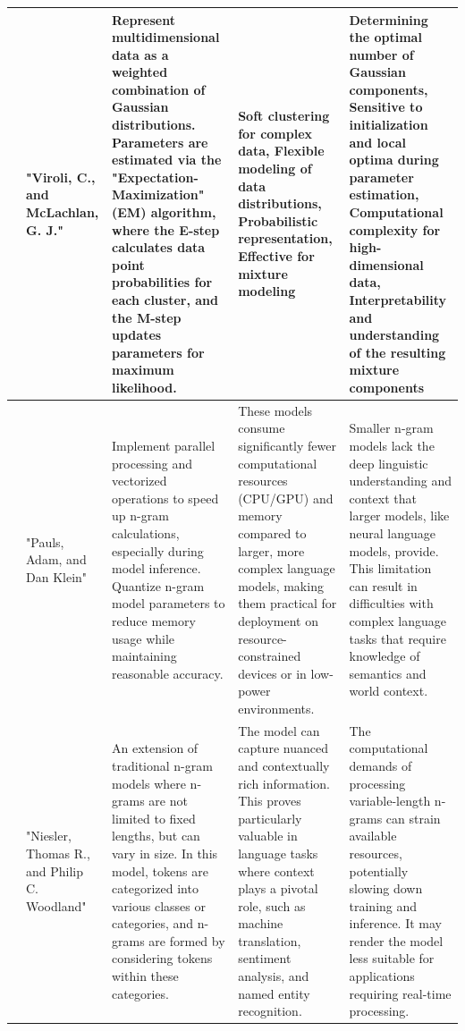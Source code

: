 \documentclass[conference]{IEEEtran}
\begin{document}
\begin{table}
\begin{center}
\begin{tabular}{ |p{1cm}|p{2cm}|p{4cm}|p{4cm}|p{4cm}| }
\hline
[9] &  "Viroli, C., and McLachlan, G. J." & Represent multidimensional data as a weighted combination of Gaussian distributions. Parameters are estimated via the "Expectation-Maximization" (EM) algorithm, where the E-step calculates data point probabilities for each cluster, and the M-step updates parameters for maximum likelihood. &  Soft clustering for complex data, Flexible modeling of data distributions, Probabilistic representation, Effective for mixture modeling &  Determining the optimal number of Gaussian components, Sensitive to initialization and local optima during parameter estimation, Computational complexity for high-dimensional data, Interpretability and understanding of the resulting mixture components \\
\hline
[10] &  "Pauls, Adam, and Dan Klein" &  Implement parallel processing and vectorized operations to speed up n-gram calculations, especially during model inference. Quantize n-gram model parameters to reduce memory usage while maintaining reasonable accuracy. &  These models consume significantly fewer computational resources (CPU/GPU) and memory compared to larger, more complex language models, making them practical for deployment on resource-constrained devices or in low-power environments. &  Smaller n-gram models lack the deep linguistic understanding and context that larger models, like neural language models, provide. This limitation can result in difficulties with complex language tasks that require knowledge of semantics and world context.  \\
\hline
[11] &  "Niesler, Thomas R., and Philip C. Woodland" & An extension of traditional n-gram models where n-grams are not limited to fixed lengths, but can vary in size. In this model, tokens are categorized into various classes or categories, and n-grams are formed by considering tokens within these categories. &  The model can capture nuanced and contextually rich information. This proves particularly valuable in language tasks where context plays a pivotal role, such as machine translation, sentiment analysis, and named entity recognition. & The computational demands of processing variable-length n-grams can strain available resources, potentially slowing down training and inference. It may render the model less suitable for applications requiring real-time processing. \\
\hline

\end{tabular}
\end{center}
\end{table}
\end{document}
